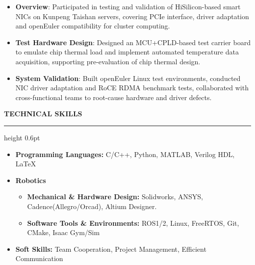 \documentclass[10pt,a4paper]{article}
\renewcommand{\section}[1]{
    \vspace{8pt}
    \noindent\textbf{\large\rmfamily\textcolor{sectionblue}{\MakeUppercase{#1}}}
    \vspace{4pt}
    \hrule height 0.6pt
    \vspace{8pt}
}
\begin{document}
\begin{itemize}[leftmargin=*, itemsep=0pt, parsep=0pt, topsep=2pt]
    \item \textbf{Overview}: Participated in testing and validation of HiSilicon-based smart NICs on Kunpeng Taishan servers, covering PCIe interface, driver adaptation and openEuler compatibility for cluster computing. 
    \item \textbf{Test Hardware Design}: Designed an MCU+CPLD-based test carrier board to emulate chip thermal load and implement automated temperature data acquisition, supporting pre-evaluation of chip thermal design.
    \item \textbf{System Validation}: Built openEuler Linux test environments, conducted NIC driver adaptation and RoCE RDMA benchmark tests, collaborated with cross-functional teams to root-cause hardware and driver defects.
\end{itemize}
\vspace{8pt}
\section{Technical Skills}
\noindent
\begin{itemize}[leftmargin=*, topsep=0pt, itemsep=0.3em]
    \item \textbf{Programming Languages:} C/C++, Python, MATLAB, Verilog HDL, \LaTeX
    
    \item \textbf{Robotics}
    \begin{itemize}[label=$\blacksquare$, leftmargin=*, topsep=0.1em, itemsep=0.2em]
        \item \textbf{Mechanical \& Hardware Design:} Solidworks, ANSYS, Cadence(Allegro/Orcad), Altium Designer.
        \item \textbf{Software Tools \& Environments: } ROS1/2, Linux, FreeRTOS, Git, CMake, Isaac Gym/Sim
        
    \end{itemize}
\item \textbf{Soft Skills: } Team Cooperation, Project Management, Efficient Communication \\
\end{itemize}
 \\
\end{document}
